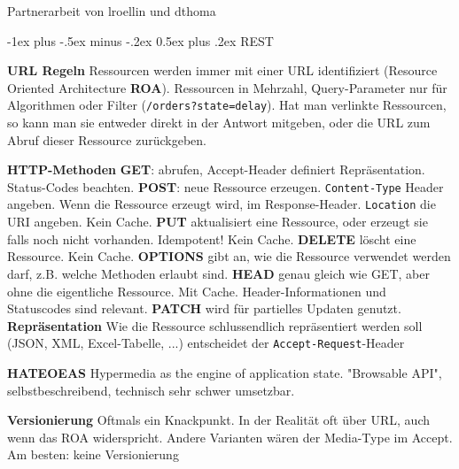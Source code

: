 \documentclass[a4paper, fontsize=6pt]{scrartcl}
\makeatletter
\renewcommand{\section}{\@startsection{section}{1}{0mm}%
    {-1ex plus -.5ex minus -.2ex}%
    {0.5ex plus .2ex}%
    {\normalfont\large\bfseries}}
\makeatother
\begin{document}
\footnotesize
\begin{multicols*}{5}


\setlength{\premulticols}{1pt}
\setlength{\postmulticols}{1pt}
\setlength{\multicolsep}{1pt}
\setlength{\columnsep}{2pt}

Partnerarbeit von lroellin und dthoma

\section{REST}

\textbf{URL Regeln}
Ressourcen werden immer mit einer URL identifiziert (Resource Oriented Architecture \textbf{ROA}). Ressourcen in Mehrzahl, Query-Parameter nur für Algorithmen oder Filter (\texttt{/orders?state=delay}). Hat man verlinkte Ressourcen, so kann man sie entweder direkt in der Antwort mitgeben, oder die URL zum Abruf dieser Ressource zurückgeben.

\textbf{HTTP-Methoden} 
\textbf{GET}: abrufen, Accept-Header definiert Repräsentation. Status-Codes beachten. \textbf{POST}: neue Ressource erzeugen. \texttt{Content-Type} Header angeben. Wenn die Ressource erzeugt wird, im Response-Header. \texttt{Location} die URI angeben. Kein Cache. \textbf{PUT} aktualisiert eine Ressource, oder erzeugt sie falls noch nicht vorhanden. Idempotent! Kein Cache. \textbf{DELETE} löscht eine Ressource. Kein Cache. \textbf{OPTIONS} gibt an, wie die Ressource verwendet werden darf, z.B. welche Methoden erlaubt sind. \textbf{HEAD} genau gleich wie GET, aber ohne die eigentliche Ressource. Mit Cache. Header-Informationen und Statuscodes sind relevant. \textbf{PATCH} wird für partielles Updaten genutzt.
\textbf{Repräsentation} 
Wie die Ressource schlussendlich repräsentiert werden soll (JSON, XML, Excel-Tabelle, ...) entscheidet der \texttt{Accept-Request}-Header

\textbf{HATEOEAS} 
Hypermedia as the engine of application state. "Browsable API", selbstbeschreibend, technisch sehr schwer umsetzbar.

\textbf{Versionierung}
Oftmals ein Knackpunkt. In der Realität oft über URL, auch wenn das ROA widerspricht. Andere Varianten wären der Media-Type im Accept. Am besten: keine Versionierung


\end{multicols*}
\end{document}
